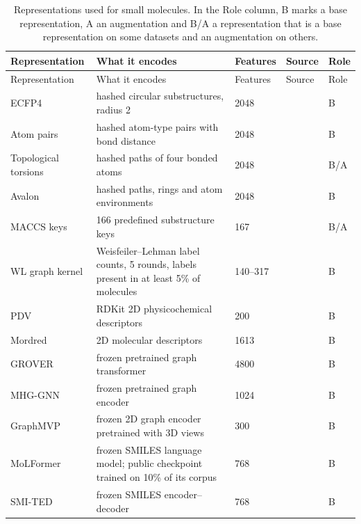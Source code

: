 {\let\small\footnotesize
\begin{longtable}{P{3.0cm}P{5.0cm}P{1.5cm}P{1.5cm}P{1.4cm}}
\caption[Representations used for small molecules.]{Representations used for small molecules. In the Role column, B marks a base representation, A an augmentation and B/A a representation that is a base representation on some datasets and an augmentation on others.}\label{tab:reps_smallmol}\\
\toprule
Representation & What it encodes & Features & Source & Role \\
\midrule
\endfirsthead
\toprule
Representation & What it encodes & Features & Source & Role \\
\midrule
\endhead
\bottomrule
\endfoot
ECFP4 & hashed circular substructures, radius 2 & 2048 & \citep{rogers2010} & B \\
Atom pairs & hashed atom-type pairs with bond distance & 2048 & \citep{Carhart1985} & B \\
Topological torsions & hashed paths of four bonded atoms & 2048 & \citep{Nilakantan1987} & B/A \\
Avalon & hashed paths, rings and atom environments & 2048 & \citep{Gedeck2006} & B \\
MACCS keys & 166 predefined substructure keys & 167 & \citep{Durant2002} & B/A \\
WL graph kernel & Weisfeiler--Lehman label counts, 5 rounds, labels present in at least 5\% of molecules & 140--317 & \citep{Shervashidze2011} & B \\
PDV & RDKit 2D physicochemical descriptors & 200 & \citep{rdkit} & B \\
Mordred & 2D molecular descriptors & 1613 & \citep{Moriwaki2018} & B \\
GROVER & frozen pretrained graph transformer & 4800 & \citep{Rong2020GROVER} & B \\
MHG-GNN & frozen pretrained graph encoder & 1024 & \citep{kishimoto2023} & B \\
GraphMVP & frozen 2D graph encoder pretrained with 3D views & 300 & \citep{Liu2022GraphMVP} & B \\
MoLFormer & frozen SMILES language model; public checkpoint trained on 10\% of its corpus & 768 & \citep{ross2022} & B \\
SMI-TED & frozen SMILES encoder--decoder & 768 & \citep{Soares2025} & B \\

\end{longtable}}
